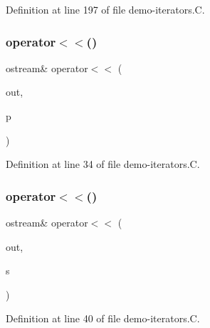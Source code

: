 Definition at line 197 of file demo-\/iterators.\+C.

\mbox{\label{demo-iterators_8_c_a923e96e2eb2a21cf7d668e804417c47a}} 
\subsubsection{\texorpdfstring{operator$<$$<$()}{operator<<()}\hspace{0.1cm}{\footnotesize\ttfamily [1/2]}}
{\footnotesize\ttfamily ostream\& operator$<$$<$ (\begin{DoxyParamCaption}\item[{ostream \&}]{out,  }\item[{const Polygon\+::\+Point\+Type \&}]{p }\end{DoxyParamCaption})}



Definition at line 34 of file demo-\/iterators.\+C.

\mbox{\label{demo-iterators_8_c_aeeb3d06d99a03eacdce5a549712941cb}} 
\subsubsection{\texorpdfstring{operator$<$$<$()}{operator<<()}\hspace{0.1cm}{\footnotesize\ttfamily [2/2]}}
{\footnotesize\ttfamily ostream\& operator$<$$<$ (\begin{DoxyParamCaption}\item[{ostream \&}]{out,  }\item[{const Polygon\+::\+Segment\+Type \&}]{s }\end{DoxyParamCaption})}



Definition at line 40 of file demo-\/iterators.\+C.

\mbox{\label{demo-iterators_8_c_af423c937ed0522544ed90c34b85d897e}} 
